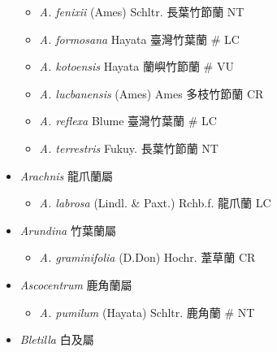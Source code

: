 \begin{itemize}
  \begin{itemize}
        \item[] \textit{A. fenixii} (Ames) Schltr.  長葉竹節蘭   NT
        \item[] \textit{A. formosana} Hayata  臺灣竹葉蘭  \# LC
        \item[] \textit{A. kotoensis} Hayata  蘭嶼竹節蘭  \# VU
        \item[] \textit{A. lucbanensis} (Ames) Ames  多枝竹節蘭   CR
        \item[] \textit{A. reflexa} Blume  臺灣竹葉蘭  \# LC
        \item[] \textit{A. terrestris} Fukuy.  長葉竹節蘭   NT
  \end{itemize}
 \item[] \textit{Arachnis} 龍爪蘭屬
                                
  \begin{itemize}
        \item[] \textit{A. labrosa} (Lindl. \& Paxt.) Rchb.f.  龍爪蘭   LC
  \end{itemize}
 \item[] \textit{Arundina} 竹葉蘭屬
                                
  \begin{itemize}
        \item[] \textit{A. graminifolia} (D.Don) Hochr.  葦草蘭   CR
  \end{itemize}
 \item[] \textit{Ascocentrum} 鹿角蘭屬
                                
  \begin{itemize}
        \item[] \textit{A. pumilum} (Hayata) Schltr.  鹿角蘭  \# NT
  \end{itemize}
 \item[] \textit{Bletilla} 白及屬
                                

\end{itemize}
